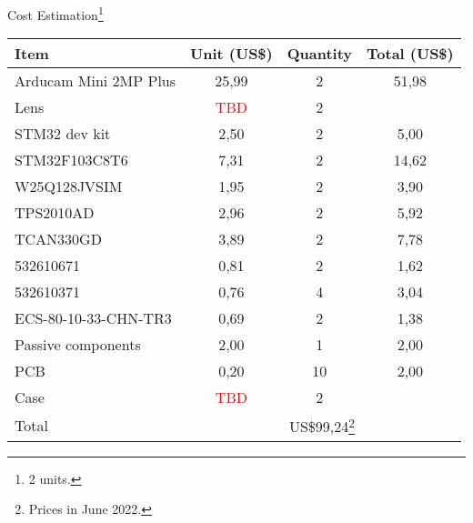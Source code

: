 \begin{frame}{Cost Estimation\footnote{2 units.}}

\begin{table}[!htb]\scriptsize
    \centering
    \label{tab:cost-estimation}
    \begin{tabular}{lccc}
        \toprule[1.5pt]
        \textbf{Item} & \textbf{Unit (US\$)} & \textbf{Quantity} & \textbf{Total (US\$)} \\
        \midrule
        Arducam Mini 2MP Plus & 25,99 & 2  & 51,98 \\
        Lens                  & \textcolor{red}{TBD} & 2  &  \\
        STM32 dev kit         & 2,50  & 2  & 5,00 \\
        STM32F103C8T6         & 7,31  & 2  & 14,62 \\
        W25Q128JVSIM          & 1,95  & 2  & 3,90 \\
        TPS2010AD             & 2,96  & 2  & 5,92 \\
        TCAN330GD             & 3,89  & 2  & 7,78 \\
        532610671             & 0,81  & 2  & 1,62 \\
        532610371             & 0,76  & 4  & 3,04 \\
        ECS-80-10-33-CHN-TR3  & 0,69  & 2  & 1,38 \\
        Passive components    & 2,00  & 1  & 2,00 \\
        PCB                   & 0,20  & 10 & 2,00 \\
        Case                  & \textcolor{red}{TBD} & 2  &  \\
        \midrule
        Total          & \multicolumn{3}{c}{US\$99,24\footnote{Prices in June 2022.}} \\
        \bottomrule[1.5pt]
    \end{tabular}
\end{table}

\end{frame}